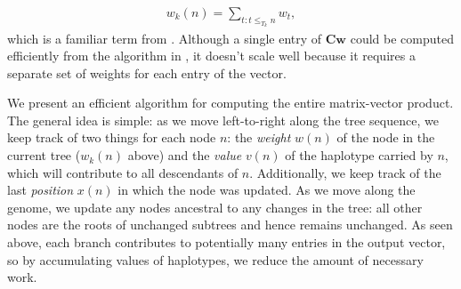 \begin{align}
    w_k(n) = \sum_{t:t \le_{T_k} n} {w}_t ,
\end{align}
which is a familiar term from \citet{ralph2020efficiently}.
Although a single entry of $\mathbf{C}\mathbf{w}$ could be computed efficiently
from the algorithm in \citet{ralph2020efficiently},
it doesn't scale well because it requires a separate set of weights for 
each entry of the vector.


We present an efficient algorithm for computing the entire matrix-vector product.
The general idea is simple: as we move left-to-right along the tree sequence,
we keep track of two things for each node $n$:
the \textit{weight} $w(n)$ of the node in the current tree ($w_k(n)$ above) and
the \textit{value} $v(n)$ of the haplotype carried by $n$,
which will contribute to all descendants of $n$.
Additionally, we keep track of the last \textit{position} $x(n)$ in which the node was updated.
As we move along the genome, we update any nodes ancestral to any changes in the tree:
all other nodes are the roots of unchanged subtrees and hence remains unchanged.
As seen above, each branch contributes to potentially many entries in the output vector,
so by accumulating values of haplotypes, we reduce the amount of necessary work.



